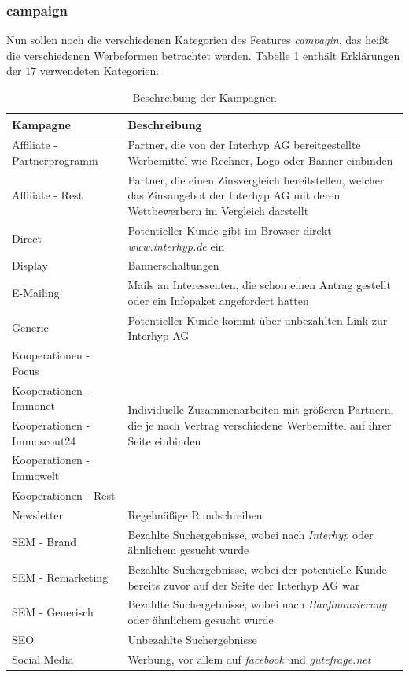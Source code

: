 \subsubsection*{campaign}
Nun sollen noch die verschiedenen Kategorien des Features \textit{campagin}, das heißt die verschiedenen Werbeformen betrachtet werden. Tabelle \ref{beschreibungCampaign} enthält Erklärungen der $17$ verwendeten Kategorien.
\begin{table}[H]
  \begin{center}
		\begin{tabular}{|l|p{10cm}|}
			\hline \textbf{Kampagne} & \textbf{Beschreibung}\\ \hline
      \hline Affiliate - Partnerprogramm & Partner, die von der Interhyp AG bereitgestellte Werbemittel wie Rechner, Logo oder Banner einbinden\\
      \hline Affiliate - Rest & Partner, die einen Zinsvergleich bereitstellen, welcher das Zinsangebot der Interhyp AG mit deren Wettbewerbern im Vergleich darstellt\\ 
      \hline Direct & Potentieller Kunde gibt im Browser direkt \textit{www.interhyp.de} ein\\ 
      \hline Display & Bannerschaltungen\\
      \hline E-Mailing & Mails an Interessenten, die schon einen Antrag gestellt oder ein Infopaket angefordert hatten\\
      \hline Generic & Potentieller Kunde kommt über unbezahlten Link zur Interhyp AG\\
			\hline Kooperationen - Focus & \multirow{5}{10cm}{Individuelle Zusammenarbeiten mit größeren Partnern, die je nach Vertrag verschiedene Werbemittel auf ihrer Seite einbinden}\\
			Kooperationen - Immonet & \\
			Kooperationen - Immoscout24 & \\
			Kooperationen - Immowelt & \\
			Kooperationen - Rest & \\
			\hline Newsletter & Regelmäßige Rundschreiben\\
			\hline SEM - Brand & Bezahlte Suchergebnisse, wobei nach \textit{Interhyp} oder ähnlichem gesucht wurde\\
			\hline SEM - Remarketing & Bezahlte Suchergebnisse, wobei der potentielle Kunde bereits zuvor auf der Seite der Interhyp AG war\\
			\hline SEM - Generisch & Bezahlte Suchergebnisse, wobei nach \textit{Baufinanzierung} oder ähnlichem gesucht wurde\\
			\hline SEO & Unbezahlte Suchergebnisse\\
			\hline Social Media & Werbung, vor allem auf \textit{facebook} und \textit{gutefrage.net}\\
			\hline
    \end{tabular} 
  \end{center}
	\caption{Beschreibung der Kampagnen}\label{beschreibungCampaign}
\end{table}
